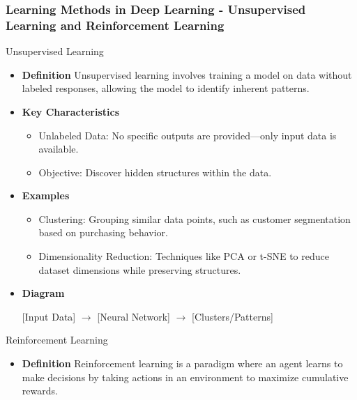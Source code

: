 \documentclass[aspectratio=169]{beamer}
\begin{document}
\begin{frame}[fragile]
    \frametitle{Learning Methods in Deep Learning - Unsupervised Learning and Reinforcement Learning}
    
    \begin{block}{Unsupervised Learning}
        \begin{itemize}
            \item \textbf{Definition}
                Unsupervised learning involves training a model on data without labeled responses, allowing the model to identify inherent patterns.
    
            \item \textbf{Key Characteristics}
                \begin{itemize}
                    \item Unlabeled Data: No specific outputs are provided—only input data is available.
                    \item Objective: Discover hidden structures within the data.
                \end{itemize}
    
            \item \textbf{Examples}
                \begin{itemize}
                    \item Clustering: Grouping similar data points, such as customer segmentation based on purchasing behavior.
                    \item Dimensionality Reduction: Techniques like PCA or t-SNE to reduce dataset dimensions while preserving structures.
                \end{itemize}
    
            \item \textbf{Diagram}
                \begin{center}
                    [Input Data] $\rightarrow$ [Neural Network] $\rightarrow$ [Clusters/Patterns]
                \end{center}
        \end{itemize}
    \end{block}

    \begin{block}{Reinforcement Learning}
        \begin{itemize}
            \item \textbf{Definition}
                Reinforcement learning is a paradigm where an agent learns to make decisions by taking actions in an environment to maximize cumulative rewards.


\end{itemize}
\end{block}
\end{frame}
\end{document}
